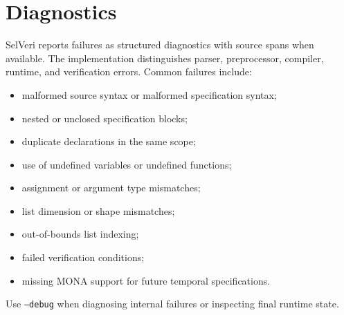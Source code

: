\documentclass[11pt]{article}
\begin{document}
\section{Diagnostics}

SelVeri reports failures as structured diagnostics with source spans when available. The implementation distinguishes parser, preprocessor, compiler, runtime, and verification errors. Common failures include:

\begin{itemize}[nosep]
  \item malformed source syntax or malformed specification syntax;
  \item nested or unclosed specification blocks;
  \item duplicate declarations in the same scope;
  \item use of undefined variables or undefined functions;
  \item assignment or argument type mismatches;
  \item list dimension or shape mismatches;
  \item out-of-bounds list indexing;
  \item failed verification conditions;
  \item missing MONA support for future temporal specifications.
\end{itemize}

Use \texttt{--debug} when diagnosing internal failures or inspecting final runtime state.
\end{document}
